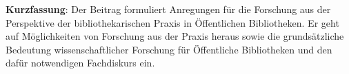 \textbf{Kurzfassung}: Der Beitrag formuliert Anregungen für die
Forschung aus der Perspektive der bibliothekarischen Praxis in
Öffentlichen Bibliotheken. Er geht auf Möglichkeiten von Forschung aus
der Praxis heraus sowie die grundsätzliche Bedeutung wissenschaftlicher
Forschung für Öffentliche Bibliotheken und den dafür notwendigen
Fachdiskurs ein.
